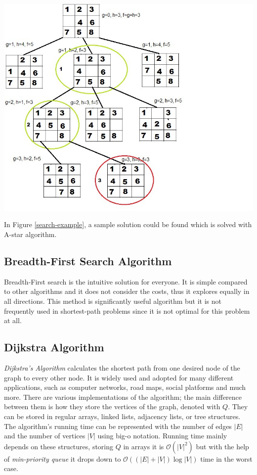 \documentclass{IEEEtran}
\begin{document}
\includegraphics[scale=0.32]{solving-puzzle.jpeg}

In Figure \ref{search-example}, a sample solution could be found which is solved with A-star algorithm. 

\subsection{Breadth-First Search Algorithm}
Breadth-First search is the intuitive solution for everyone. It is simple compared to other algorithms and it does not consider the costs, thus it explores equally in all directions. This method is significantly useful algorithm but it is not frequently used in shortest-path problems since it is not optimal for this problem at all. 

\subsection{Dijkstra Algorithm}
\textit{Dijkstra's Algorithm} calculates the shortest path from one desired node of the graph to every other node. It is widely used and adopted for many different applications, such as computer networks, road maps, social platforms and much more. There are various implementations of the algorithm; the main difference between them is how they store the vertices of the graph, denoted with $Q$. They can be stored in regular arrays, linked lists, adjacency lists, or tree structures. The algorithm's running time can be represented with the number of edges $|E|$ and the number of vertices $|V|$ using big-o notation. Running time mainly depends on these structures, storing $Q$ in arrays it is $\mathcal{O}(|V|^2)$ but with the help of \textit{min-priority queue} it drops down to $\mathcal{O}((|E| + |V|) \log{|V|})$ time in the worst case. 
\end{document}

